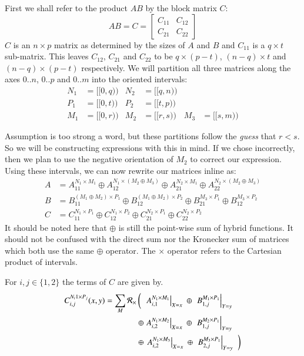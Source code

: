 First we shall refer to the product $AB$ by the block matrix $C$:
\begin{equation}
	AB = C = \begin{bmatrix} C_{11} & C_{12} \\ C_{21} & C_{22} \end{bmatrix}
\end{equation}
$C$ is an $n \times p$ matrix as determined by the sizes of $A$ and $B$ and $C_{11}$ is a $q \times t$ sub-matrix.
This leaves $C_{12}$, $C_{21}$ and $C_{22}$ to be $q \times (p-t)$, $(n-q) \times t$ and $(n-q) \times (p-t)$ respectively.
We will partition all three matrices along the axes $0.. n$, $0..p$ and $0..m$ into the oriented intervals:
\begin{align*}
	N_1 	&= [\![0, q)\!) 	& N_2 	&= [\![q, n)\!) 	\\
	P_1 	&= [\![0, t)\!) 	& P_2 	&= [\![t, p)\!) 	\\
	M_1 	&= [\![0, r)\!) 	& M_2 	&= [\![r, s)\!) 	& M_3 	&= [\![s, m)\!)
\end{align*}


Assumption is too strong a word, but these partitions follow the \emph{guess} that $r<s$.
So we will be constructing expressions with this in mind. 
If we chose incorrectly, then we plan to use the negative orientation of $M_2$ to correct our expression.
Using these intervals, we can now rewrite our matrices inline as:
\begin{align}
	A & =	A_{11}^{N_1 \times M_1} \oplus A_{12}^{N_1 \times (M_2 \oplus M_3)} \oplus 
			A_{21}^{N_2 \times M_1} \oplus A_{22}^{N_2 \times (M_2 \oplus M_3)} \\
	B & =	B_{11}^{(M_1 \oplus M_2) \times P_1} \oplus B_{12}^{(M_1 \oplus M_2) \times P_2} \oplus 
			B_{21}^{M_3 \times P_1} \oplus B_{12}^{M_3 \times P_2}\\
	\label{eqn:2x2multiplicationblocks}
	C & =	C_{11}^{N_1 \times P_1} \oplus C_{12}^{N_1 \times P_2} \oplus
			C_{21}^{N_2 \times P_1} \oplus C_{22}^{N_2 \times P_2}
\end{align}
It should be noted here that $\oplus$ is still the point-wise sum of hybrid functions.
It should not be confused with the direct sum nor the Kronecker sum of matrices which both use the same $\oplus$ operator.
The $\times$ operator refers to the Cartesian product of intervals. 


For $i,j \in \{ 1,2 \}$ the terms of $C$ are given by.
\begin{align}
	\label{eqn:2x2multiplication}
	C_{i,j}^{N_i1 \times P_j} (x,y) = \sum_{M} \R[\times]  
		&\left( \;\;
			\left. 	A_{i,1}^{N_1 \times M_1}	\right|_{X=x} \;\oplus\;
			\left.	B_{1,j}^{M_1 \times P_1}	\right|_{Y=y} 
		\right.  \notag \\
	 	&\oplus
	 		\left.	A_{i,2}^{N_1 \times M_2}	\right|_{X=x} \;\oplus\;
			\left. 	B_{1,j}^{M_2 \times P_1}	\right|_{Y=y} 
		\notag \\
		&\oplus\left.
			\left.	A_{i,2}^{N_1 \times M_3}	\right|_{X=x} \;\oplus\;
			\left. 	B_{2,j}^{M_3 \times P_1}	\right|_{Y=y}
		\;\;\right)
\end{align}


